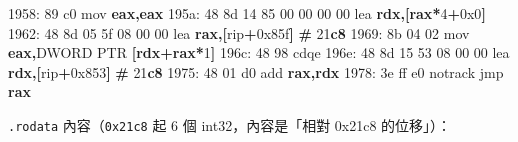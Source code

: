 \documentclass[10pt,a4paper]{article}
\newenvironment{Shaded}{\begin{snugshade}}{\end{snugshade}}
\newcommand{\BaseNTok}[1]{\textcolor[rgb]{0.00,0.00,0.81}{#1}}
\newcommand{\BuiltInTok}[1]{#1}
\newcommand{\DataTypeTok}[1]{\textcolor[rgb]{0.13,0.29,0.53}{#1}}
\newcommand{\DecValTok}[1]{\textcolor[rgb]{0.00,0.00,0.81}{#1}}
\newcommand{\ErrorTok}[1]{\textcolor[rgb]{0.64,0.00,0.00}{\textbf{#1}}}
\newcommand{\KeywordTok}[1]{\textcolor[rgb]{0.13,0.29,0.53}{\textbf{#1}}}
\newcommand{\NormalTok}[1]{#1}
\newcommand{\OperatorTok}[1]{\textcolor[rgb]{0.81,0.36,0.00}{\textbf{#1}}}
\renewenvironment{Shaded}{%
  \def\FrameCommand{\fboxsep=3.2pt\colorbox{shadecolor}}%
  \MakeFramed{\advance\hsize-\width\FrameRestore\small}%
}{%
  \endMakeFramed
}
\begin{document}
\begin{Shaded}
\begin{Highlighting}[]
\NormalTok{1958: 89 c0                  mov    }\KeywordTok{eax}\OperatorTok{,}\KeywordTok{eax}
\NormalTok{195a: 48 8d 14 85 00 00 00 00  }\BuiltInTok{lea}  \KeywordTok{rdx}\OperatorTok{,[}\KeywordTok{rax}\OperatorTok{*}\DecValTok{4}\OperatorTok{+}\BaseNTok{0x0}\OperatorTok{]}
\NormalTok{1962: 48 8d 05 5f 08 00 00   }\BuiltInTok{lea}    \KeywordTok{rax}\OperatorTok{,[}\NormalTok{rip}\OperatorTok{+}\BaseNTok{0x85f}\OperatorTok{]}   \OperatorTok{\#} \DecValTok{21}\ErrorTok{c8}
\NormalTok{1969: 8b 04 02               }\BuiltInTok{mov}    \KeywordTok{eax}\OperatorTok{,}\DataTypeTok{DWORD} \DataTypeTok{PTR} \OperatorTok{[}\KeywordTok{rdx}\OperatorTok{+}\KeywordTok{rax}\OperatorTok{*}\DecValTok{1}\OperatorTok{]}
\NormalTok{196c: 48 98                  }\BuiltInTok{cdqe}
\NormalTok{196e: 48 8d 15 53 08 00 00   }\BuiltInTok{lea}    \KeywordTok{rdx}\OperatorTok{,[}\NormalTok{rip}\OperatorTok{+}\BaseNTok{0x853}\OperatorTok{]}   \OperatorTok{\#} \DecValTok{21}\ErrorTok{c8}
\NormalTok{1975: 48 01 d0               add    }\KeywordTok{rax}\OperatorTok{,}\KeywordTok{rdx}
\NormalTok{1978: 3e ff e0               notrack jmp }\KeywordTok{rax}
\end{Highlighting}
\end{Shaded}

\texttt{.\allowbreak{}rodata} 內容（\texttt{0x21c8} 起 6 個 int32，內容是「相對
0x21c8 的位移」）：
\end{document}
